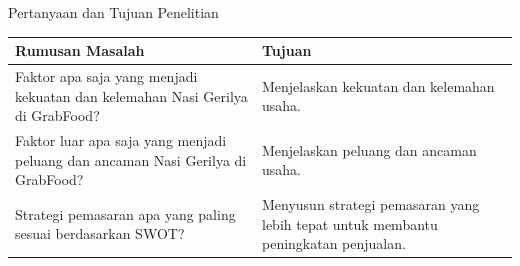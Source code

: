 \documentclass[aspectratio=169,11pt]{beamer}
\begin{document}
\begin{frame}{Pertanyaan dan Tujuan Penelitian}
\scriptsize
\setlength{\tabcolsep}{4pt}
\renewcommand{\arraystretch}{1.18}
\begin{tabularx}{\textwidth}{@{}L{0.43\textwidth}Y@{}}
\toprule
\textbf{Rumusan Masalah} & \textbf{Tujuan} \\
\midrule
Faktor apa saja yang menjadi kekuatan dan kelemahan Nasi Gerilya di \mbox{GrabFood?} & Menjelaskan kekuatan dan kelemahan usaha. \\
\addlinespace[0.12cm]
Faktor luar apa saja yang menjadi peluang dan ancaman Nasi Gerilya di \mbox{GrabFood?} & Menjelaskan peluang dan ancaman usaha. \\
\addlinespace[0.12cm]
Strategi pemasaran apa yang paling sesuai berdasarkan SWOT? & Menyusun strategi pemasaran yang lebih tepat untuk membantu peningkatan penjualan. \\
\bottomrule
\end{tabularx}
\end{frame}
\end{document}
